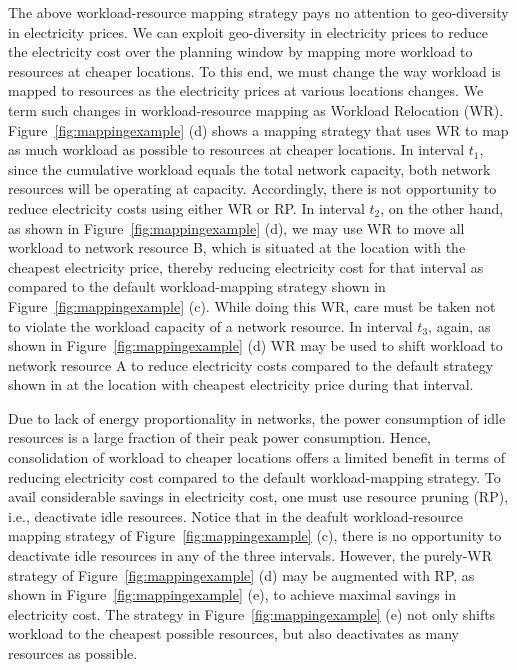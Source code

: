 The above workload-resource mapping strategy pays no attention to geo-diversity in electricity prices. We can exploit geo-diversity in electricity prices to reduce the electricity cost over the planning window by mapping more workload to resources at cheaper locations. To this end, we must change the way workload is mapped to resources as the electricity prices at various locations changes. We term such changes in workload-resource mapping as Workload Relocation (WR). Figure~\ref{fig:mappingexample} (d) shows a mapping strategy that uses WR to map as much workload as possible to resources at cheaper locations. In interval $t_1$, since the cumulative workload equals the total network capacity, both network resources will be operating at capacity. Accordingly, there is not opportunity to reduce electricity costs using either WR or RP. In interval $t_2$, on the other hand, as shown in Figure~\ref{fig:mappingexample} (d), we may use WR to move all workload to network resource B, which is situated at the location with the cheapest electricity price, thereby reducing electricity cost for that interval as compared to the default workload-mapping strategy shown in Figure~\ref{fig:mappingexample} (c). While doing this WR, care must be taken not to violate the workload capacity of a network resource. In interval $t_3$, again, as shown in Figure~\ref{fig:mappingexample} (d) WR may be used to shift workload to network resource A to reduce electricity costs compared to the default strategy shown in at the location with cheapest electricity price during that interval.

Due to lack of energy proportionality in networks, the power consumption of idle resources is a large fraction of their peak power consumption. Hence, consolidation of workload to cheaper locations offers a limited benefit in terms of reducing electricity cost compared to the default workload-mapping strategy. To avail considerable savings in electricity cost, one must use resource pruning (RP), i.e., deactivate idle resources. Notice that in the deafult workload-resource mapping strategy of Figure~\ref{fig:mappingexample} (c), there is no opportunity to deactivate idle resources in any of the three intervals. However, the purely-WR strategy of Figure~\ref{fig:mappingexample} (d) may be augmented with RP, as shown in Figure~\ref{fig:mappingexample} (e), to achieve maximal savings in electricity cost. The strategy in Figure~\ref{fig:mappingexample} (e) not only shifts workload to the cheapest possible resources, but also deactivates as many resources as possible. 

